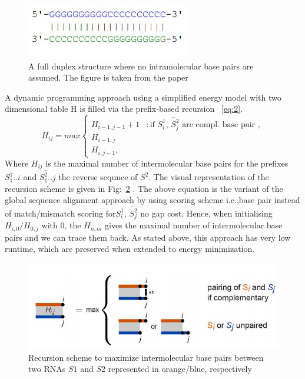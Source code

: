 \documentclass[twoside,a4paper]{report}
\numberwithin{equation}{section}
\begin{document}
	\begin{figure}[H]
		\includegraphics[width=0.4\linewidth]{rnahybrid}
		\centering
		\caption{ A full duplex structure where no intramolecular base pairs are assumed. The figure is taken from the paper \citep{wright2018structure}} 
		\label{Fig:rnahybrid}
	\end{figure}
	
	
	 A dynamic programming approach using a simplified energy model with two dimensional table H is filled via the prefix-based recursion ~\ref{eq:2}.\\
	 \begin{equation}
	 \label{eq:2}
	H_{ij} = max \begin{cases}
	H_{i-1,j-1}+1 & : \text{if $S^1_i$, $\overleftarrow{S^2_j}$ are compl. base pair }, \\
	H_{i-1,j} \\
	H_{i,j-1} ,
	\end{cases}
	\end{equation}
	Where $H_{ij}$ is the maximal number of intermolecular base pairs for the prefixes $S^1_1..i$	and $\overleftarrow{S^2_1..j}$ the reverse sequnce of $S^2$. The visual representation of the recursion scheme is given in Fig:~\ref{fig:hybrid} . The above equation is the variant of the global sequence alignment approach by \citet{needleman1970general} using scoring scheme i.e.,base pair instead of match/mismatch scoring for$S^1_i$, $\overleftarrow{S^2_j}$ no gap cost. Hence, when initialising $ H_{i,0} / H_{0,j} $ with 0, the $H_{n,m} $ gives the maximal number of intermolecular base pairs and we can trace them back. As stated above, this approach has very low runtime, which are preserved when extended to energy minimization.\\
	
	 \begin{figure}[tb]
		\includegraphics[width=0.8\linewidth]{hybrid}
		\centering
		\caption{Recursion scheme to maximize intermolecular base pairs between two RNAs $S1$ and $S2$ represented in orange/blue, respectively} 
		\label{fig:hybrid}
	\end{figure}
\end{document}
